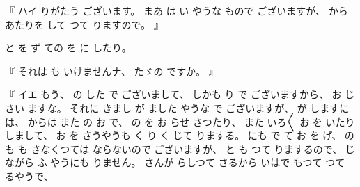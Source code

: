 %
『
ハイ
りがたう
ございます。
%
まあ
は
い
やうな
もので
ございますが、
%
から
あたりを
して
つて
りますので。
』

%
と
を
ず
ての
を
に
したり。

%
『
それは
も
いけませんナ、
%
たゞの%
ですか。
』

%
『
イエ
もう、
%
の
した
で
ございまして、
%
しかも
り
で
ございますから、
%
お
じ
さい
ますな。
%
それに
きまし
が%
ました
やうな
で
ございますが、
%
が%
しますには、
%
からは
また
の
お
で、
%
の
を
お
らせ
さつたり、
%
また
いろ〳〵
お
を
いたり%
しまして、
%
お
を
%
さうやうも
く
り
く
じて
りまする。
%
にも
で
て
お
を
げ、
%
の
も
も
さなくつては
ならないので
ございますが、
%
と%
も
つて
りまするので、
%
じながら
ふ
やうにも
りません。
%
さんが
らしつて
さるから
いはで
もつて
つて
るやうで、
%
